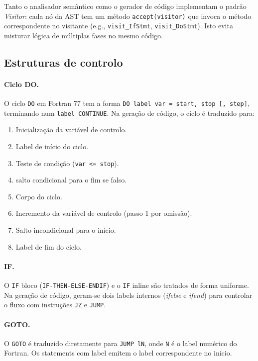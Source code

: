 \documentclass[11pt, a4paper, fleqn]{article}
\begin{document}
\noindent Tanto o analisador semântico como o gerador de código implementam o padrão \textit{Visitor}: cada nó da AST tem um método \texttt{accept(visitor)} que invoca o método correspondente no visitante (e.g., \texttt{visit\_IfStmt}, \texttt{visit\_DoStmt}). Isto evita misturar lógica de múltiplas fases no mesmo código.

\subsection{Estruturas de controlo}

\paragraph{Ciclo DO.}
O ciclo \texttt{DO} em Fortran 77 tem a forma \texttt{DO label var = start, stop [, step]}, terminando num \texttt{label CONTINUE}. Na geração de código, o ciclo é traduzido para:

\begin{enumerate}
    \item Inicialização da variável de controlo.
    \item Label de início do ciclo.
    \item Teste de condição (\texttt{var <= stop}).
    \item salto condicional para o fim se falso.
    \item Corpo do ciclo.
    \item Incremento da variável de controlo (passo 1 por omissão).
    \item Salto incondicional para o início.
    \item Label de fim do ciclo.
\end{enumerate}

\paragraph{IF.}
O \texttt{IF} bloco (\texttt{IF-THEN-ELSE-ENDIF}) e o \texttt{IF} inline são tratados de forma uniforme. Na geração de código, geram-se dois labels internos (\textit{ifelse} e \textit{ifend}) para controlar o fluxo com instruções \texttt{JZ} e \texttt{JUMP}.

\paragraph{GOTO.}
O \texttt{GOTO} é traduzido diretamente para \texttt{JUMP lN}, onde \texttt{N} é o label numérico do Fortran. Os statements com label emitem o label correspondente no início.
\end{document}
